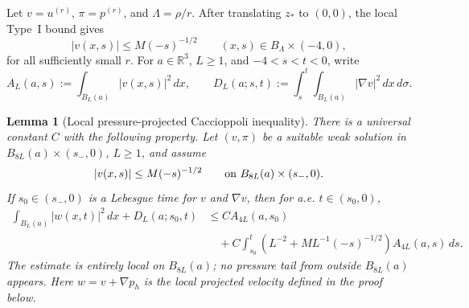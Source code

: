 \documentclass[11pt]{amsart}
\numberwithin{equation}{section}
\theoremstyle{plain}
\newtheorem{lemma}[theorem]{Lemma}
\theoremstyle{definition}
\theoremstyle{remark}
\begin{document}
Let \(v=u^{(r)}\), \(\pi=p^{(r)}\), and
\(\Lambda=\rho/r\).  After translating \(z_*\) to \((0,0)\), the local Type~I
bound gives
\[
   |v(x,s)|\le M(-s)^{-1/2}
   \qquad (x,s)\in B_\Lambda\times(-4,0),
\]
for all sufficiently small \(r\).  For \(a\in\mathbb R^3\), \(L\ge1\), and
\(-4<s<t<0\), write
\[
   A_L(a,s):=\int_{B_L(a)}|v(x,s)|^2\,dx,\qquad
   D_L(a;s,t):=\int_s^t\int_{B_L(a)}|\nabla v|^2\,dx\,d\sigma .
\]

\begin{lemma}[Local pressure-projected Caccioppoli inequality]
\label{lem:local-pressure-projected-caccioppoli}
There is a universal constant \(C\) with the following property.  Let
\((v,\pi)\) be a suitable weak solution in
\(B_{8L}(a)\times(s_-,0)\), \(L\ge1\), and assume
\[
   |v(x,s)|\le M(-s)^{-1/2}
   \qquad\hbox{on }B_{8L}(a)\times(s_-,0).
\]
If \(s_0\in(s_-,0)\) is a Lebesgue time for \(v\) and \(\nabla v\), then for
a.e. \(t\in(s_0,0)\),
\begin{equation}\label{eq:pressure-projected-caccioppoli}
\begin{aligned}
   \int_{B_L(a)}|w(x,t)|^2\,dx+D_L(a;s_0,t)
   &\le
   C A_{4L}(a,s_0)                                      \\
   &\quad
   +C\int_{s_0}^{t}
      \left(L^{-2}+ML^{-1}(-s)^{-1/2}\right)
      A_{4L}(a,s)\,ds .
\end{aligned}
\end{equation}
The estimate is entirely local on \(B_{8L}(a)\); no pressure tail from outside
\(B_{8L}(a)\) appears.  Here \(w=v+\nabla p_h\) is the local projected velocity
defined in the proof below.
\end{lemma}
\end{document}
